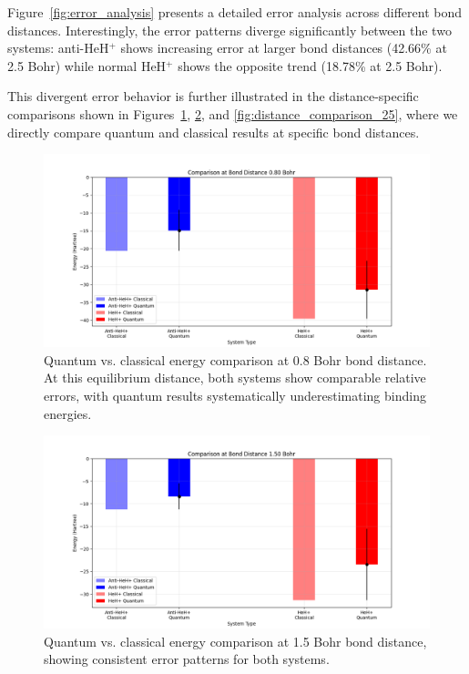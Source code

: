 \documentclass[10pt,twocolumn,a4paper]{article}
\begin{document}
Figure~\ref{fig:error_analysis} presents a detailed error analysis across different bond distances. Interestingly, the error patterns diverge significantly between the two systems: anti-HeH$^+$ shows increasing error at larger bond distances (42.66\% at 2.5 Bohr) while normal HeH$^+$ shows the opposite trend (18.78\% at 2.5 Bohr).

This divergent error behavior is further illustrated in the distance-specific comparisons shown in Figures~\ref{fig:distance_comparison_08}, \ref{fig:distance_comparison_15}, and \ref{fig:distance_comparison_25}, where we directly compare quantum and classical results at specific bond distances.

\begin{figure}[t!]
    \centering
    \includegraphics[width=\columnwidth]{graphs/quantum_comparison_distance_0.80.png}
    \caption{Quantum vs. classical energy comparison at 0.8 Bohr bond distance. At this equilibrium distance, both systems show comparable relative errors, with quantum results systematically underestimating binding energies.}
    \label{fig:distance_comparison_08}
\end{figure}

\begin{figure}[t!]
    \centering
    \includegraphics[width=\columnwidth]{graphs/quantum_comparison_distance_1.50.png}
    \caption{Quantum vs. classical energy comparison at 1.5 Bohr bond distance, showing consistent error patterns for both systems.}
    \label{fig:distance_comparison_15}
\end{figure}
\end{document}
